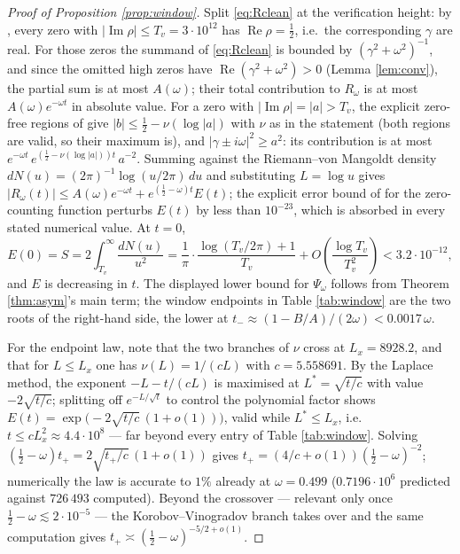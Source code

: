 \documentclass[11pt,reqno]{amsart}
\theoremstyle{plain}
\theoremstyle{definition}
\newcommand{\Rp}{\operatorname{Re}}
\newcommand{\Ip}{\operatorname{Im}}
\begin{document}
\begin{proof}[Proof of Proposition \ref{prop:window}]
Split \eqref{eq:Rclean} at the verification height: by \cite{PlattTrudgian}, every zero with
$|\Ip\rho|\le T_v=3\cdot10^{12}$ has $\Rp\rho=\tfrac12$, i.e.\ the corresponding $\gamma$ are real.
For those zeros the summand of \eqref{eq:Rclean} is bounded by $(\gamma^{2}+\omega^{2})^{-1}$, and
since the omitted high zeros have $\Rp(\gamma^{2}+\omega^{2})>0$ (Lemma \ref{lem:conv}), the partial
sum is at most $A(\omega)$; their total contribution to $R_\omega$ is at most $A(\omega)e^{-\omega
t}$ in absolute value. For a zero with $|\Ip\rho|=|a|>T_v$, the explicit zero-free regions of
\cite{MTY} give $|b|\le\tfrac12-\nu(\log|a|)$ with $\nu$ as in the statement (both regions are
valid, so their maximum is), and $|\gamma\pm i\omega|^{2}\ge a^{2}$: its contribution is at most
$e^{-\omega t}\,e^{(\frac12-\nu(\log|a|))t}\,a^{-2}$. Summing against the Riemann--von Mangoldt
density $dN(u)=(2\pi)^{-1}\log(u/2\pi)\,du$ and substituting $L=\log u$ gives
$|R_\omega(t)|\le A(\omega)e^{-\omega t}+e^{(\frac12-\omega)t}E(t)$; the explicit error bound of
\cite{TrudgianArg} for the zero-counting function perturbs $E(t)$ by less than $10^{-23}$, which
is absorbed in every stated numerical value. At $t=0$,
\[
  E(0)=S=2\int_{T_v}^{\infty}\frac{dN(u)}{u^{2}}
  =\frac{1}{\pi}\cdot\frac{\log(T_v/2\pi)+1}{T_v}+O\!\left(\frac{\log T_v}{T_v^{2}}\right)
  <3.2\cdot10^{-12},
\]
and $E$ is decreasing in $t$. The displayed lower bound for $\Psi_\omega$ follows from Theorem
\ref{thm:asym}'s main term; the window endpoints in Table \ref{tab:window} are the two roots of
the right-hand side, the lower at $t_{-}\approx(1-B/A)/(2\omega)<0.0017\,\omega$.

For the endpoint law, note that the two branches of $\nu$ cross at $L_x=8928.2$, and that for
$L\le L_x$ one has $\nu(L)=1/(cL)$ with $c=5.558691$. By the Laplace method, the exponent
$-L-t/(cL)$ is maximised at $L^{*}=\sqrt{t/c}$ with value $-2\sqrt{t/c}$; splitting off
$e^{-L/\sqrt t}$ to control the polynomial factor shows
$E(t)=\exp\bigl(-2\sqrt{t/c}\,(1+o(1))\bigr)$, valid while $L^{*}\le L_x$, i.e.\
$t\le cL_x^{2}\approx4.4\cdot10^{8}$ --- far beyond every entry of Table \ref{tab:window}.
Solving $(\tfrac12-\omega)t_{+}=2\sqrt{t_{+}/c}\,(1+o(1))$ gives
$t_{+}=(4/c+o(1))(\tfrac12-\omega)^{-2}$; numerically the law is accurate to $1\%$ already at
$\omega=0.499$ ($0.7196\cdot10^{6}$ predicted against $726\,493$ computed). Beyond the crossover
--- relevant only once $\tfrac12-\omega\lesssim2\cdot10^{-5}$ --- the Korobov--Vinogradov branch
takes over and the same computation gives $t_{+}\asymp(\tfrac12-\omega)^{-5/2+o(1)}$.
\end{proof}
\end{document}
